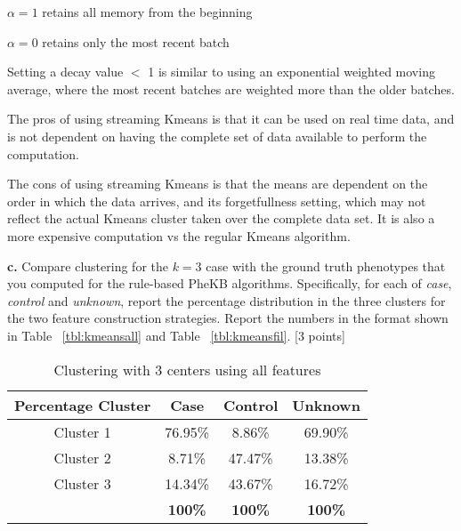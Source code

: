 \documentclass[12pt]{article}
\begin{document}
\hspace{9mm}	$\alpha=1$ retains all memory from the beginning
	
\hspace{9mm}	$\alpha=0$ retains only the most recent batch

\vspace{5mm}
	
Setting a decay value $ < $ 1 is similar to using an exponential weighted moving average, where the most recent batches are weighted more than the older batches.
	
The pros of using streaming Kmeans is that it can be used on real time data, and is not dependent on having the complete set of data available to perform the computation.

\vspace{5mm}

The cons of using streaming Kmeans is that the means are dependent on the order in which the data arrives, and its forgetfullness setting, which may not reflect the actual Kmeans cluster taken over the complete data set.  It is also a more expensive computation vs the regular Kmeans algorithm.

\vspace{5mm}
\textbf{c.} Compare clustering for the $k=3$ case with the ground truth phenotypes that you computed for the rule-based PheKB algorithms. Specifically, for each of \textit{case}, \textit{control} and \textit{unknown}, report the percentage distribution in the three clusters for the two feature construction strategies. Report the numbers in the format shown in Table ~\ref{tbl:kmeansall} and Table ~\ref{tbl:kmeansfil}. [3 points]

\begin{table}[h]
\centering
\begin{tabular}{ c | c | c | c }
  \hline
  Percentage Cluster & Case & Control & Unknown\\
  \hline                       
  Cluster 1 & 76.95\% & 8.86\% & 69.90\% \\
  Cluster 2 & 8.71\% & 47.47\% & 13.38\% \\
  Cluster 3 & 14.34\% & 43.67\% & 16.72\% \\
  \hline  
   & \bf{100\%} & \bf{100\%} & \bf{100\%} \\
  \hline  
\end{tabular}
\caption{Clustering with 3 centers using all features}
\label{tbl:skmeansall}
\end{table}
\end{document}
